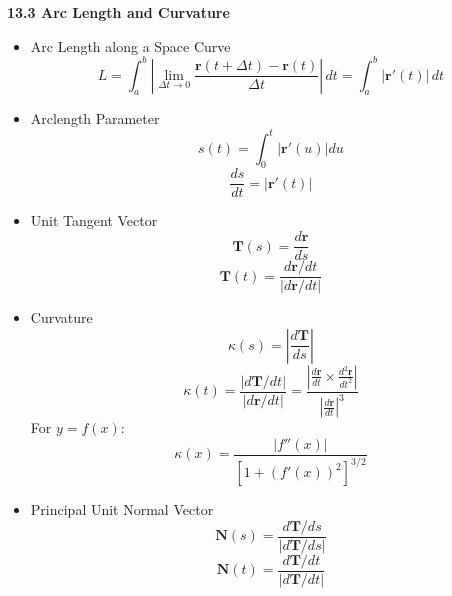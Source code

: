 \documentclass[12pt]{article}
\renewcommand{\vec}[1]{\mathbf{#1}}
\newcommand{\dvar}[1]{\,d{#1}}
\newcommand{\<}{\left<}
\renewcommand{\>}{\right>}
\begin{document}
\newpage

\centerline{\bf 13.3 Arc Length and Curvature}

  \begin{itemize}
    \item Arc Length along a Space Curve
          \[L = \int_a^b \left|\lim_{\Delta{t}\to0}\frac{\vec{r}(t+\Delta{t})-\vec{r}(t)}{\Delta{t}}\right| \dvar{t} = \int_a^b |\vec{r}'(t)| \dvar{t}\]

    \item Arclength Parameter 
      \[s(t) = \int_0^t |\vec{r}'(u)|du\]
      \[\frac{ds}{dt} = |\vec{r}'(t)|\]

    \item Unit Tangent Vector
      \[\vec{T}(s) = \frac{d\vec{r}}{ds}\]
      \[\vec{T}(t) = \frac{d\vec{r}/dt}{|d\vec{r}/dt|}\]





    \item Curvature
      \[
        \kappa(s) = \left|\frac{d\vec{T}}{ds}\right| 
      \]
      \[
        \kappa(t) = \frac{|d\vec{T}/dt|}{|d\vec{r}/dt|} = \frac{|\frac{d\vec{r}}{dt}\times \frac{d^2\vec{r}}{dt^2}|}{|\frac{d\vec{r}}{dt}|^3}
      \]
      For $y=f(x)$:
      \[
        \kappa(x) = \frac{|f''(x)|}{[1+(f'(x))^2]^{3/2}}
      \]
    
    
    
    \item Principal Unit Normal Vector
      \[\vec{N}(s) = \frac{d\vec{T}/ds}{|d\vec{T}/ds|}\]
      \[\vec{N}(t) = \frac{d\vec{T}/dt}{|d\vec{T}/dt|}\]
    

\end{itemize}
\end{document}
